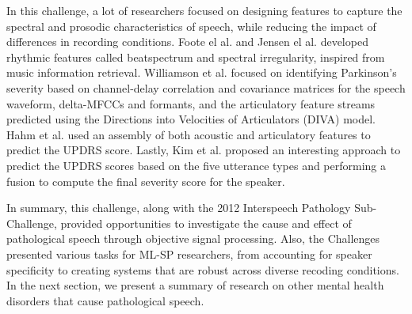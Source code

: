 \documentclass{article}
\begin{document}
In this challenge, a lot of researchers focused on designing features to capture the spectral and prosodic characteristics of speech, while reducing the impact of differences in recording conditions.
Foote el al. \cite{foote2002audio} and Jensen el al. \cite{jensen1999timbre} developed rhythmic features called beatspectrum and spectral irregularity, inspired from music information retrieval. 
Williamson et al. \cite{williamson2015segment} focused on identifying Parkinson's severity based on channel-delay correlation and covariance matrices for the speech waveform, delta-MFCCs and formants, and the articulatory feature streams predicted using the Directions into Velocities of Articulators (DIVA) model. 
Hahm et al. \cite{hahm2015parkinson} used an assembly of both acoustic and articulatory features to predict the UPDRS score. Lastly, Kim et al. \cite{kim2015automatic} proposed an interesting approach to predict the UPDRS scores based on the five utterance types and performing a fusion to compute the final severity score for the speaker.

In summary, this challenge, along with the 2012 Interspeech Pathology Sub-Challenge, provided opportunities to investigate the cause and effect of pathological speech through objective signal processing. Also, the Challenges presented various tasks for ML-SP researchers, from accounting for speaker specificity to creating systems that are robust across diverse recoding conditions. In the next section, we present a summary of research on other mental health disorders that cause pathological speech.
\end{document}
